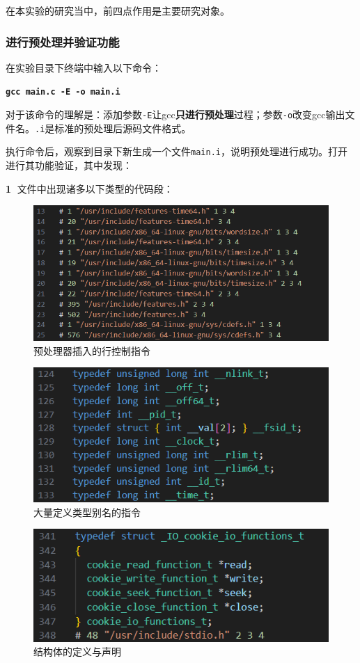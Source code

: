 \documentclass[UTF8,a4paper,10pt]{ctexart}
\begin{document}
在本实验的研究当中，前四点作用是主要研究对象。

\subsubsection{进行预处理并验证功能}
在实验目录下终端中输入以下命令：

\begin{center}
    \textcolor{deepblue}{\textbf{\texttt{\large{gcc main.c -E -o main.i}}}}
\end{center}

对于该命令的理解是：添加参数\texttt{-E}让gcc\textbf{只进行预处理}过程；参数\texttt{-o}改变gcc输出文件名。\texttt{.i}是标准的预处理后源码文件格式。

执行命令后，观察到目录下新生成一个文件\texttt{main.i}，说明预处理进行成功。打开进行其功能验证，其中发现：

\textbf{\textcircled{1}} 文件中出现诸多以下类型的代码段：
\begin{figure} [H]
    \centering
    \includegraphics[width=0.70\linewidth]{cpp_1.png}
    \caption{预处理器插入的行控制指令}
    \label{fig:placeholder}
\end{figure} \label{pic2}

\begin{figure} [H]
    \centering
    \includegraphics[width=0.70\linewidth]{cpp_2.png}
    \caption{大量定义类型别名的指令}
    \label{fig:placeholder}
\end{figure}

\begin{figure} [H]
    \centering
    \includegraphics[width=0.70\linewidth]{cpp_3.png}
    \caption{结构体的定义与声明}
    \label{fig:placeholder}
\end{figure}
\end{document}
